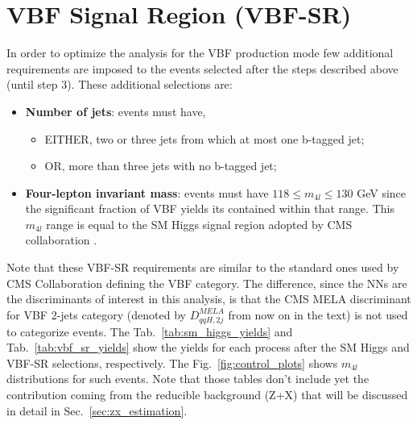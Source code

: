 \section{VBF Signal Region (VBF-SR)}
\label{subsec:vbf_sr}
In order to optimize the analysis for the VBF production mode few additional requirements are imposed to the events selected after the steps described above (until step 3). These additional selections are:
\begin{itemize}
	\item \textbf{Number of jets}: events must have,
	\begin{itemize}
		\item EITHER, two or three jets from which at most one b-tagged jet;
		\item OR, more than three jets with no b-tagged jet;
	\end{itemize}
	\item \textbf{Four-lepton invariant mass}: events must have $118 \leq m_{4l} \leq 130$ GeV since the significant fraction of VBF yields its contained within that range. This $m_{4l}$ range is equal to the SM Higgs signal region adopted by CMS collaboration \cite{bib:JHEP11_047_2017}.
\end{itemize} 

Note that these VBF-SR requirements are similar to the standard ones used by CMS Collaboration defining the VBF category. The difference, since the NNs are the discriminants of interest in this analysis, is that the CMS MELA discriminant for VBF 2-jets category (denoted by $D_{qqH,2j}^{MELA}$ from now on in the text) is not used to categorize events. The Tab.~\ref{tab:sm_higgs_yields} and Tab.~\ref{tab:vbf_sr_yields} show the yields for each process after the SM Higgs and VBF-SR selections, respectively. The Fig.~\ref{fig:control_plots} shows $m_{4l}$ distributions for such events. Note that those tables don't include yet the contribution coming from the reducible background (Z+X) that will be discussed in detail in Sec.~\ref{sec:zx_estimation}.

